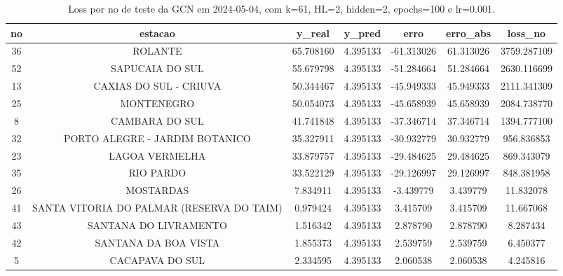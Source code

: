 \begin{table}[h]
\centering
\caption{Loss por no de teste da GCN em 2024-05-04, com k=61, HL=2, hidden=2, epochs=100 e lr=0.001.}
\label{tab:gcn_loss_k61_hl2_h2_e100_d20240504}
\begin{tabular}{ccccccc}
\toprule
no & estacao & y\_real & y\_pred & erro & erro\_abs & loss\_no \\
\midrule
36 & ROLANTE & 65.708160 & 4.395133 & -61.313026 & 61.313026 & 3759.287109 \\
52 & SAPUCAIA DO SUL & 55.679798 & 4.395133 & -51.284664 & 51.284664 & 2630.116699 \\
13 & CAXIAS DO SUL - CRIUVA & 50.344467 & 4.395133 & -45.949333 & 45.949333 & 2111.341309 \\
25 & MONTENEGRO & 50.054073 & 4.395133 & -45.658939 & 45.658939 & 2084.738770 \\
8 & CAMBARA DO SUL & 41.741848 & 4.395133 & -37.346714 & 37.346714 & 1394.777100 \\
32 & PORTO ALEGRE - JARDIM BOTANICO & 35.327911 & 4.395133 & -30.932779 & 30.932779 & 956.836853 \\
23 & LAGOA VERMELHA & 33.879757 & 4.395133 & -29.484625 & 29.484625 & 869.343079 \\
35 & RIO PARDO & 33.522129 & 4.395133 & -29.126997 & 29.126997 & 848.381958 \\
26 & MOSTARDAS & 7.834911 & 4.395133 & -3.439779 & 3.439779 & 11.832078 \\
41 & SANTA VITORIA DO PALMAR (RESERVA DO TAIM) & 0.979424 & 4.395133 & 3.415709 & 3.415709 & 11.667068 \\
43 & SANTANA DO LIVRAMENTO & 1.516342 & 4.395133 & 2.878790 & 2.878790 & 8.287434 \\
42 & SANTANA DA BOA VISTA & 1.855373 & 4.395133 & 2.539759 & 2.539759 & 6.450377 \\
5 & CACAPAVA DO SUL & 2.334595 & 4.395133 & 2.060538 & 2.060538 & 4.245816 \\
\bottomrule
\end{tabular}
\end{table}
